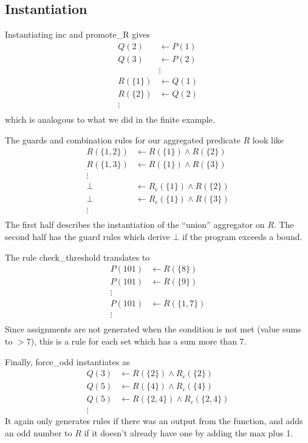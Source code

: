 \subsection{Instantiation}
Instantiating inc and promote_R gives
\begin{align*}
	Q(2) &\leftarrow P(1)\\
	Q(3) &\leftarrow P(2)\\
	&\vdots\\
	R(\{1\}) &\leftarrow Q(1)\\
	R(\{2\}) &\leftarrow Q(2)\\
	\vdots\\
\end{align*}
which is analogous to what we did in the finite example.

The guards and combination rules for our aggregated predicate $R$ look like
\begin{align*}
	R(\{1, 2\}) &\leftarrow R(\{1\}) \wedge R(\{2\})\\
	R(\{1, 3\}) &\leftarrow R(\{1\}) \wedge R(\{3\})\\
	\vdots\\
	\bot &\leftarrow R_c(\{1\}) \wedge R(\{2\})\\
	\bot &\leftarrow R_c(\{1\}) \wedge R(\{3\})\\
	\vdots\\
\end{align*}
The first half describes the instantiation of the ``union'' aggregator on $R$.
The second half has the guard rules which derive $\bot$ if the program exceeds a bound.

The rule check\_threshold translates to
\begin{align*}
	P(101) &\leftarrow R(\{8\})\\
	P(101) &\leftarrow R(\{9\})\\
	\vdots\\
	P(101) &\leftarrow R(\{1, 7\})\\
	\vdots\\
\end{align*}
Since assignments are not generated when the condition is not met (value sums to $> 7$), this is a rule for each set which has a sum more than 7.

Finally, force\_odd instantiates as
\begin{align*}
	Q(3) &\leftarrow R(\{2\}) \wedge R_c(\{2\})\\
	Q(5) &\leftarrow R(\{4\}) \wedge R_c(\{4\})\\
	Q(5) &\leftarrow R(\{2, 4\}) \wedge R_c(\{2, 4\})\\
	\vdots
\end{align*}
It again only generates rules if there was an output from the function, and adds an odd number to $R$ if it doesn't already have one by adding the max plus 1.

